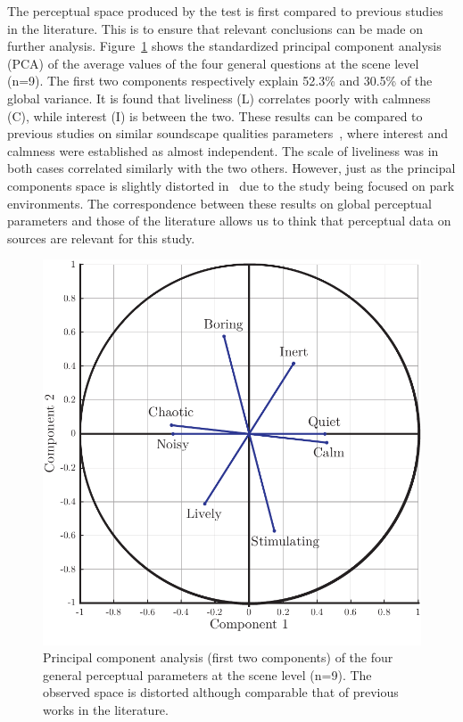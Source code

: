 \documentclass{article}
\begin{document}
\begin{sloppy}
The perceptual space produced by the test is first compared to previous studies in the literature. This is to ensure that relevant conclusions can be made on further analysis. Figure~\ref{fig:pca} shows the standardized principal component analysis (PCA) of the average values of the four general questions at the scene level (n=9). The first two components respectively explain 52.3\% and 30.5\% of the global variance. It is found that liveliness (L) correlates poorly with calmness (C), while interest (I) is between the two. These results can be compared to previous studies on similar soundscape qualities parameters~\cite{axelsson2010, cain2013, jeon2018}, where interest and calmness were established as almost independent. The scale of liveliness was in both cases correlated similarly with the two others. However, just as the principal components space is slightly distorted in~\cite{jeon2018} due to the study being focused on park environments. The correspondence between these results on global perceptual parameters and those of the literature allows us to think that perceptual data on sources are relevant for this study.

\begin{figure}[t]
  \centering
  \centerline{\includegraphics[width=0.8\columnwidth]{pca.pdf}}
  \caption{Principal component analysis (first two components) of the four general perceptual parameters at the scene level (n=9). The observed space is distorted although comparable that of previous works in the literature.}
  \label{fig:pca}
\end{figure}


\end{sloppy}
\end{document}
